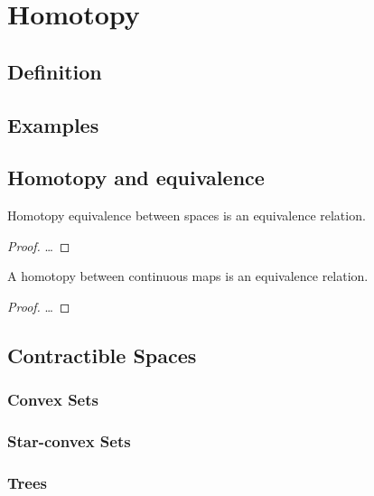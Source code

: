 \documentclass[10pt]{article}
\begin{document}


\section{Homotopy}

\subsection{Definition}
\subsection{Examples}
\subsection{Homotopy and equivalence}

\begin{theorem}
  Homotopy equivalence between spaces is an equivalence relation.
\end{theorem}

\begin{proof}
  \ldots
\end{proof}

\begin{theorem}
  A homotopy between continuous maps is an equivalence relation.
\end{theorem}

\begin{proof}
  \ldots
\end{proof}

\subsection{Contractible Spaces}

\subsubsection{Convex Sets}

\subsubsection{Star-convex Sets}

\subsubsection{Trees}
\end{document}
